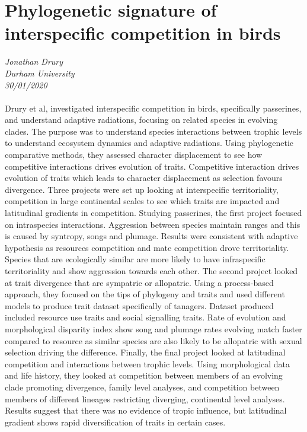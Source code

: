 \documentclass[11pt]{article}
\begin{document}
\section{Phylogenetic signature of interspecific competition in birds}
\textit{Jonathan Drury\\Durham University\\30/01/2020}
\\
\\Drury et al, investigated interspecific competition in birds, specifically passerines, and understand adaptive radiations, focusing on related species in evolving clades. The purpose was to understand species interactions between trophic levels to understand ecosystem dynamics and adaptive radiations. Using phylogenetic comparative methods, they assessed character displacement to see how competitive interactions drives evolution of traits. Competitive interaction drives evolution of traits which leads to character displacement as selection favours divergence. Three projects were set up looking at interspecific territoriality, competition in large continental scales to see which traits are impacted and latitudinal gradients in competition. Studying passerines, the first project focused on intraspecies interactions. Aggression between species maintain ranges and this is caused by syntropy, songs and plumage. Results were consistent with adaptive hypothesis as resources competition and mate competition drove territoriality. Species that are ecologically similar are more likely to have infraspecific territoriality and show aggression towards each other. The second project looked at trait divergence that are sympatric or allopatric. Using a process-based approach, they focused on the tips of phylogeny and traits and used different models to produce trait dataset specifically of tanagers. Dataset produced included resource use traits and social signalling traits. Rate of evolution and morphological disparity index show song and plumage rates evolving match faster compared to resource as similar species are also likely to be allopatric with sexual selection driving the difference. Finally, the final project looked at latitudinal competition and interactions between trophic levels. Using morphological data and life history, they looked at competition between members of an evolving clade promoting divergence, family level analyses, and competition between members of different lineages restricting diverging, continental level analyses. Results suggest that there was no evidence of tropic influence, but latitudinal gradient shows rapid diversification of traits in certain cases.
\end{document}

